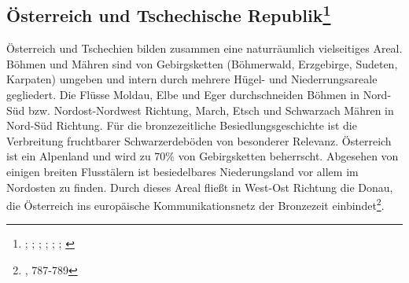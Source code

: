 \documentclass[openany,twoside,twocolumn]{book}
\let\rmarkdownfootnote\footnote%
\def\footnote{\protect\rmarkdownfootnote}
\begin{document}
\hypertarget{osterreich-und-tschechische-republik}{%
\subsection[Österreich und Tschechische
Republik]{\texorpdfstring{Österreich und Tschechische Republik\footnote{\textcite{hampl_mittelbronzezeitliche_1982};
  \textcite{hicke_hugel-_1987}; \textcite{lauermann_studien_2003};
  \textcite{lippert_brandbestattungen_2013};
  \textcite{lubos_czech_2013}; \textcite{neugebauer_bronzezeit_1994};
  \textcite{vera_saldova_burial_1990}}}{Österreich und Tschechische Republik}}\label{osterreich-und-tschechische-republik}}

Österreich und Tschechien bilden zusammen eine naturräumlich
vielseitiges Areal. Böhmen und Mähren sind von Gebirgsketten
(Böhmerwald, Erzgebirge, Sudeten, Karpaten) umgeben und intern durch
mehrere Hügel- und Niederrungsareale gegliedert. Die Flüsse Moldau, Elbe
und Eger durchschneiden Böhmen in Nord-Süd bzw. Nordost-Nordwest
Richtung, March, Etsch und Schwarzach Mähren in Nord-Süd Richtung. Für
die bronzezeitliche Besiedlungsgeschichte ist die Verbreitung
fruchtbarer Schwarzerdeböden von besonderer Relevanz. Österreich ist ein
Alpenland und wird zu 70\% von Gebirgsketten beherrscht. Abgesehen von
einigen breiten Flusstälern ist besiedelbares Niederungsland vor allem
im Nordosten zu finden. Durch dieses Areal fließt in West-Ost Richtung
die Donau, die Österreich ins europäische Kommunikationsnetz der
Bronzezeit einbindet\footnote{\textcite{lubos_czech_2013}, 787-789}.
\end{document}
